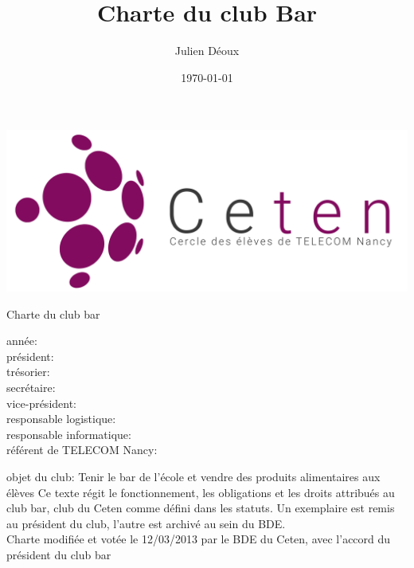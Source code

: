 \documentclass{article} %
\title{Charte du club Bar}
\author{Julien Déoux}
\date\today
\begin{document}
	

	\begin{titlepage}
		\begin{center}
			\includegraphics[width=\textwidth]{images/ceten}\par
			\vspace{2cm}
			{\Huge \light{} Charte du club bar}\par
			\vfill
			\begin{spacing}{1.5}
				année: \underline{\hspace{2cm}}\\
				président: \underline{\hspace{8cm}}\\
				trésorier: \underline{\hspace{8cm}}\\
				secrétaire: \underline{\hspace{8cm}}\\
				vice-président: \underline{\hspace{8cm}}\\
				responsable logistique: \underline{\hspace{8cm}}\\
				responsable informatique: \underline{\hspace{8cm}}\\
				référent de TELECOM Nancy: \underline{\hspace{8cm}}\\
			\end{spacing}
			\vspace{\baselineskip}
			objet du club: Tenir le bar de l'école et vendre des produits
			alimentaires aux élèves
			\vfill
			{\footnotesize \light{} Ce texte régit le fonctionnement, les
			obligations et les droits attribués au club bar, club du Ceten comme
			défini dans les statuts. Un exemplaire est remis au président du
			club, l’autre est archivé au sein du BDE\@. \\
			Charte modifiée et votée le 12/03/2013 par le BDE du Ceten, avec
			l'accord du président du club bar}
		\end{center}
	\end{titlepage}
\end{document}
